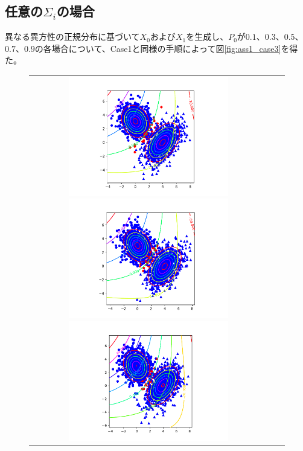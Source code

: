 \documentclass[uplatex,a4paper]{jsarticle}
\begin{document}
\subsection{任意の$\Sigma_i$の場合}
異なる異方性の正規分布に基づいて$X_0$および$X_1$を生成し、$P_0$が$0.1$、$0.3$、$0.5$、$0.7$、$0.9$の各場合について、Case1と同様の手順によって図\ref{fig:ass1_case3}を得た。
\begin{figure}[H]
\begin{center}
\begin{tabular}{ccc}
\begin{minipage}{0.33\hsize}
\includegraphics[width=7cm]{Model3_10.pdf}
\end{minipage}
\begin{minipage}{0.33\hsize}
\includegraphics[width=7cm]{Model3_30.pdf}
\end{minipage}
\begin{minipage}{0.33\hsize}
\includegraphics[width=7cm]{Model3_50.pdf}
\end{minipage}

\end{tabular}
\end{center}
\end{figure}
\end{document}
